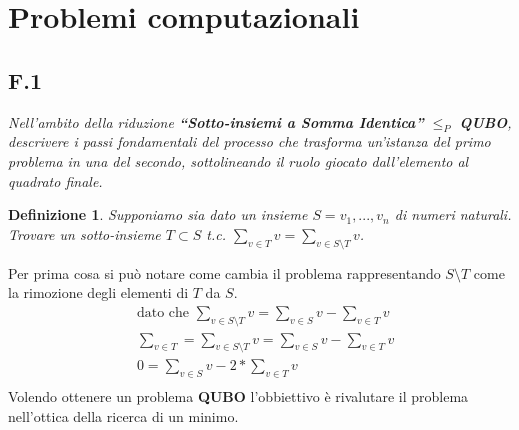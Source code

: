 \documentclass[a4paper]{article}
\newtheorem*{definition}{Definizione}
\begin{document}
\section{Problemi computazionali}
\subsection{F.1}
\label{SEC:F1}
\emph{Nell’ambito della riduzione \textbf{“Sotto-insiemi a Somma Identica”} $\leq_P$ \textbf{QUBO}, descrivere i passi fondamentali del processo che trasforma un’istanza del primo problema in una del secondo, sottolineando il ruolo giocato dall’elemento al quadrato finale.}

\begin{definition}
	Supponiamo sia dato un insieme $S = {v_1 , . . . , v_n }$ di numeri naturali. Trovare un sotto-insieme $T \subset S$ t.c.  $\sum_{v\in T} v = \sum_{v \in S \setminus T}v $.
\end{definition}
Per prima cosa si può notare come cambia il problema rappresentando $S \setminus T$ come la rimozione degli elementi di $T$ da $S$.
\begin{align*}
	 &\text{dato che }\sum_{v \in S \setminus T}v = \sum_{v\in S} v - \sum_{v\in T} v \\
	 &\sum_{v\in T} = \sum_{v \in S \setminus T}v = \sum_{v\in S} v - \sum_{v\in T} v \\
	 &0 = \sum_{v\in S} v - 2 * \sum_{v\in T} v \\
\end{align*}
Volendo ottenere un problema \textbf{QUBO} l'obbiettivo è rivalutare il problema nell'ottica della ricerca di un minimo.
\end{document}
